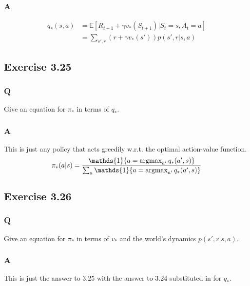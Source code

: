 \subsubsection{A}
\begin{align}
    q_* (s, a) &= \mathbb{E} [ R_{t+1} + \gamma v_*(S_{t+1}) | S_t = s, A_t = a] \\
    &= \sum_{s', r} (r + \gamma v_*(s'))p(s', r | s, a)
\end{align} 


\subsection{Exercise 3.25}
\subsubsection{Q}
Give an equation for $\pi_*$ in terms of $q_*$.

\subsubsection{A}
This is just any policy that acts greedily w.r.t. the optimal action-value function.
\begin{equation}
    \pi_* (a|s) = \frac{\mathds{1}\{a = \argmax_{a'} q_*(a', s)\}}{\sum_{a} \mathds{1}\{a = \argmax_{a'}q_*(a', s)\}}
\end{equation} 

\subsection{Exercise 3.26}
\subsubsection{Q}
Give an equation for $\pi_*$ in terms of $v_*$ and the world's dynamics $p(s', r| s, a)$.

\subsubsection{A}
This is just the answer to 3.25 with the answer to 3.24 substituted in for $q_*$.


